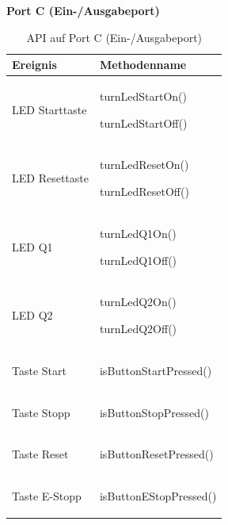 \documentclass[a4paper, 11pt]{article}
\begin{document}
\newpage

\noindent\textbf{Port C (Ein-/Ausgabeport)}
\begin{table}[h]
\center
\begin{tabularx}{\textwidth}{|X|X|}
\hline
\textbf{Ereignis}&\textbf{Methodenname}\\
\hline
LED Starttaste&\begin{compactenum}[]
           \item \ttfamily turnLedStartOn()
           \item \ttfamily turnLedStartOff()
           \end{compactenum}\\
\hline
LED Resettaste&\begin{compactenum}[]
           \item \ttfamily turnLedResetOn()
           \item \ttfamily turnLedResetOff()
           \end{compactenum}\\
\hline
LED Q1&\begin{compactenum}[]
           \item \ttfamily turnLedQ1On()
           \item \ttfamily turnLedQ1Off()
           \end{compactenum}\\
\hline
LED Q2&\begin{compactenum}[]
           \item \ttfamily turnLedQ2On()
           \item \ttfamily turnLedQ2Off()
           \end{compactenum}\\
\hline
Taste Start&\begin{compactenum}[]
           \item \ttfamily isButtonStartPressed()
           \end{compactenum}\\
\hline
Taste Stopp&\begin{compactenum}[]
           \item \ttfamily isButtonStopPressed()
           \end{compactenum}\\
\hline
Taste Reset&\begin{compactenum}[]
           \item \ttfamily isButtonResetPressed()
           \end{compactenum}\\
\hline
Taste E-Stopp&\begin{compactenum}[]
           \item \ttfamily isButtonEStopPressed()
           \end{compactenum}\\
\hline
\end{tabularx}
\caption{API auf Port C (Ein-/Ausgabeport)}
\label{portC}
\end{table}
\end{document}
